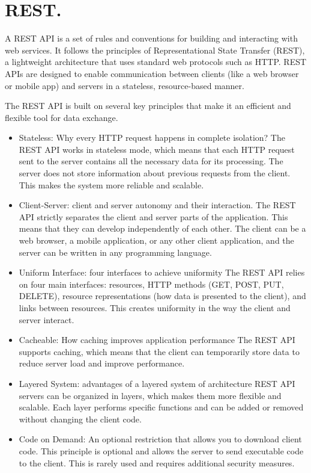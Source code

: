 
\pagebreak
\chapter{REST.}


\medskip

A REST API is a set of rules and conventions for building and interacting with web services. It follows the principles of Representational State Transfer (REST), a lightweight architecture that uses standard web protocols such as HTTP. REST APIs are designed to enable communication between clients (like a web browser or mobile app) and servers in a stateless, resource-based manner.

The REST API is built on several key principles that make it an efficient and flexible tool for data exchange.

\begin{itemize}
\item Stateless: Why every HTTP request happens in complete isolation?
The REST API works in stateless mode, which means that each HTTP request sent to the server contains all the necessary data for its processing. The server does not store information about previous requests from the client. This makes the system more reliable and scalable.

\item Client-Server: client and server autonomy and their interaction.
The REST API strictly separates the client and server parts of the application. This means that they can develop independently of each other. The client can be a web browser, a mobile application, or any other client application, and the server can be written in any programming language.

\item Uniform Interface: four interfaces to achieve uniformity
The REST API relies on four main interfaces: resources, HTTP methods (GET, POST, PUT, DELETE), resource representations (how data is presented to the client), and links between resources. This creates uniformity in the way the client and server interact.

\item Cacheable: How caching improves application performance
The REST API supports caching, which means that the client can temporarily store data to reduce server load and improve performance.

\item Layered System: advantages of a layered system of architecture
REST API servers can be organized in layers, which makes them more flexible and scalable. Each layer performs specific functions and can be added or removed without changing the client code.

\item Code on Demand: An optional restriction that allows you to download client code.
This principle is optional and allows the server to send executable code to the client. This is rarely used and requires additional security measures.
\end{itemize}


